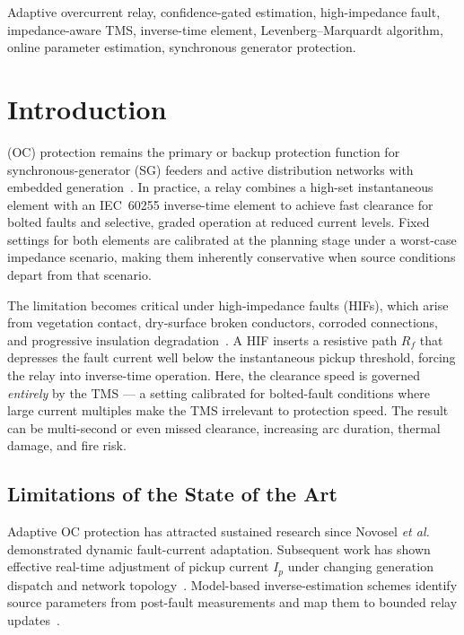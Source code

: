 \documentclass[10pt,journal,twoside]{IEEEtran}
\newcommand{\Rf}{R_{\!f}}
\begin{document}
\begin{IEEEkeywords}
Adaptive overcurrent relay, confidence-gated estimation,
high-impedance fault, impedance-aware TMS, inverse-time element,
Levenberg--Marquardt algorithm, online parameter estimation,
synchronous generator protection.
\end{IEEEkeywords}

\section{Introduction}
\label{sec:intro}

 (OC) protection remains the primary or backup
protection function for synchronous-generator (SG) feeders and active
distribution networks with embedded generation~\cite{Anderson1995,Blackburn2006}.
In practice, a relay combines a high-set instantaneous element with an
IEC~60255 inverse-time element to achieve fast clearance for bolted faults
and selective, graded operation at reduced current levels.  Fixed settings for
both elements are calibrated at the planning stage under a worst-case impedance
scenario, making them inherently conservative when source conditions depart
from that scenario.

The limitation becomes critical under high-impedance faults (HIFs), which
arise from vegetation contact, dry-surface broken conductors, corroded
connections, and progressive insulation degradation~\cite{Lazkano2000,
Ghaderi2017,Wester1998}.  A HIF inserts a resistive path $\Rf$ that depresses
the fault current well below the instantaneous pickup threshold,
forcing the relay into inverse-time operation.  Here, the clearance speed
is governed \emph{entirely} by the TMS --- a setting calibrated for
bolted-fault conditions where large current multiples make the TMS
irrelevant to protection speed.  The result can be multi-second or
even missed clearance, increasing arc duration, thermal damage,
and fire risk.

\subsection{Limitations of the State of the Art}

Adaptive OC protection has attracted sustained research since Novosel
\emph{et al.}~\cite{Novosel1994} demonstrated dynamic fault-current
adaptation.  Subsequent work has shown effective real-time adjustment
of pickup current $I_p$ under changing generation dispatch and network
topology~\cite{Sharaf2011,Saleh2017,Darlington2021}.  Model-based
inverse-estimation schemes identify source parameters from post-fault
measurements and map them to bounded relay updates~\cite{Eluvathingal2025_TR01,
Eluvathingal2026_TR02}.
\end{document}
